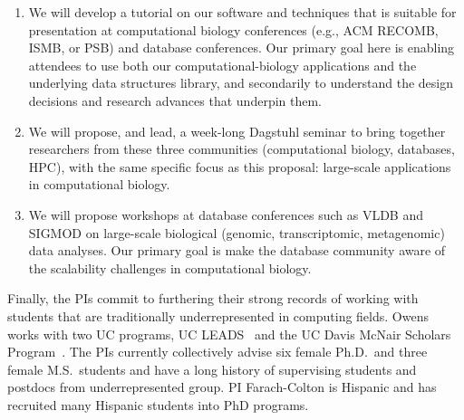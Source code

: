 \begin{enumerate}[leftmargin=*,noitemsep]
  \item We will develop a tutorial on our software and techniques that is suitable for presentation at computational biology conferences (e.g., ACM RECOMB, ISMB, or PSB) and database conferences. Our primary goal here is enabling attendees to use both our computational-biology applications and the underlying data structures library, and secondarily to understand the design decisions and research advances that underpin them.
  \item We will propose, and lead, a week-long Dagstuhl seminar to bring together researchers from these three communities (computational biology, databases, HPC), with the same specific focus as this proposal: large-scale applications in computational biology.
  \item We will propose workshops at database conferences such as VLDB and SIGMOD on large-scale biological (genomic, transcriptomic, metagenomic) data analyses. Our primary goal is make the database community aware of the scalability challenges in computational biology. 
\end{enumerate}

Finally, the PIs commit to furthering their strong records of working with students that are traditionally underrepresented in computing fields. Owens works with two UC programs, UC LEADS~\cite{UCLeads:2003:WEB} and the UC Davis McNair Scholars Program~\cite{McNair:2003:WEB}.  The PIs currently collectively advise six female Ph.D.\ and three female M.S.\ students and have a long history of supervising students and postdocs from underrepresented group.
PI Farach-Colton is Hispanic and has recruited many Hispanic students into PhD programs.
